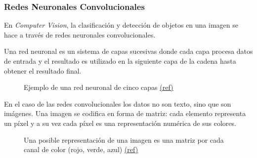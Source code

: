 \documentclass[a4paper]{article}
\begin{document}
\subsubsection{Redes Neuronales Convolucionales}

En \textit{Computer Vision}, la clasificación y detección de objetos en una imagen se hace a través de redes neuronales convolucionales.

Una red neuronal es un sistema de capas sucesivas donde cada capa procesa datos de entrada y el resultado es utilizado en la siguiente capa de la cadena hasta obtener el resultado final.

\begin{figure}[H]
\caption{Ejemplo de una red neuronal de cinco capas \scriptsize{\href{https://alexlenail.me/NN-SVG/index.html}{(ref)}}}
\end{figure}


En el caso de las redes convolucionales los datos no son texto, sino que son imágenes.
Una imagen se codifica en forma de matriz: cada elemento representa un píxel y a su vez cada píxel es una representación numérica de sus colores.

\begin{figure}[H]
\caption{Una posible representación de una imagen es una matriz por cada canal de color (rojo, verde, azul) \scriptsize{\href{https://www.researchgate.net/publication/282798184_The_project_is_based_on_emerging_field_Image_Processing_In_this_project_A_Graphical_User_Interface_has_been_designed_using_the_software_Labwindows_which_can_process_both_type_of_Real_time_Image_Proces}{(ref)}}}
\end{figure}
\end{document}
